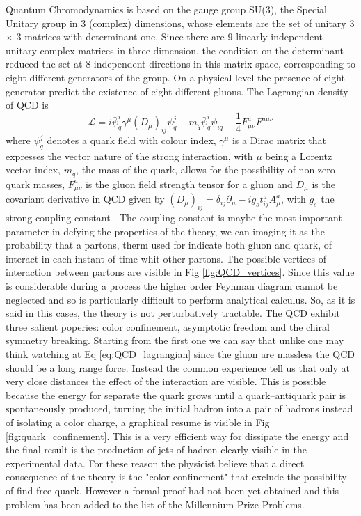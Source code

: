\documentclass[12pt,a4paper]{book}
\begin{document}
	 Quantum Chromodynamics is based on the gauge group SU(3), the Special Unitary group in 3 (complex) dimensions, whose elements are the set of unitary 3 × 3 matrices with determinant one. Since there are 9 linearly independent unitary complex matrices in three dimension, the condition on the determinant reduced the set at 8 independent directions in this matrix space, corresponding to eight different generators of the group. On a physical level the presence of eight generator predict the existence of eight different gluons.  The Lagrangian density of QCD is
	\begin{equation}
		\boxed{\mathcal{L}= i \bar{\psi}^i_q \gamma^\mu(D_\mu)_{ij}\psi^j_q- m_q \bar{\psi}^i_q \psi_{iq}-\frac{1}{4} F^a_{\mu \nu} F^{a\mu \nu}}
		\label{eq:QCD_lagrangian}
	\end{equation} 
	where $\psi^j_q$ denotes a quark field with colour index, $\gamma^\mu$ is a Dirac matrix that expresses the vector nature of the strong interaction, with $\mu$ being a Lorentz vector index, $m_q$, the mass of the quark, allows for the possibility of non-zero quark masses, $F^a_{\mu \nu}$ is the gluon field strength tensor for a gluon and $D_\mu$ is the covariant derivative in QCD given by $(D_\mu)_{ij}= \delta_{ij} \partial_\mu - ig_s t^a_{ij} A^a_\mu$, with $g_s$ the strong coupling constant \cite{Skands_2013}.
	The coupling constant is maybe the most important parameter in defying the properties of the theory, we can imaging it as the probability that a partons, therm used for indicate both gluon and quark, of interact in each instant of time whit other partons. The possible vertices of interaction between partons are visible in Fig \ref{fig:QCD_vertices}. Since this value is considerable during a process the higher order Feynman diagram cannot be neglected and so is particularly difficult to perform analytical calculus. So, as it is said in this cases, the theory is not perturbatively tractable.  
	The QCD exhibit three salient poperies: color confinement, asymptotic freedom and the chiral symmetry breaking. 
	Starting from the first one we can say that unlike one may think watching at Eq \ref{eq:QCD_lagrangian} since the gluon are massless the QCD should be a long range force. Instead the common experience tell us that only at very close distances the effect of the interaction are visible. This is possible because the energy for separate the quark grows until a quark–antiquark pair is spontaneously produced, turning the initial hadron into a pair of hadrons instead of isolating a color charge, a graphical resume is visible in Fig \ref{fig:quark_confinement}. This is a very efficient way for dissipate the energy and the final result is the production of jets of hadron clearly visible in the experimental data. For these reason the physicist believe that a direct consequence of the theory is the "color confinement" that exclude the possibility of find free quark. However a formal proof had not been yet obtained and this problem has been added to the list of the Millennium Prize Problems. 	
\end{document}
